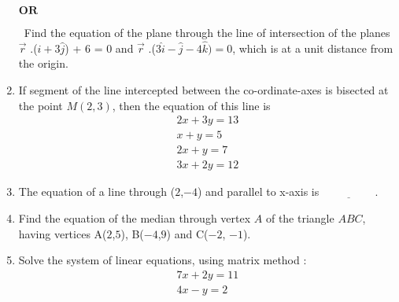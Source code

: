 \documentclass{article}
\begin{document}
\begin{enumerate}
\begin{center}
    $\textbf{OR}$
\end{center}
\ Find the equation of the plane through the line of intersection of the planes \\
    $ \overrightarrow{r}$ .($\hat{i}+3\hat{j}$) + 6 = 0  and  $ \overrightarrow{r}$ .($3\hat{i} - \hat{j} - 4\hat{k}) = 0$, which is at a unit distance from the origin.\\
    \item If segment of the line intercepted between the co-ordinate-axes is bisected
at the point $M(2, 3)$, then the equation of this line is
 \begin{align}
       2x + 3y = 13\\
       x + y = 5 \\
       2x + y = 7\\
       3x + 2y = 12
\end{align}
\item The equation of a line through ($2$,$-4$) and parallel to x-axis is $\underline{\hspace{2cm}}$.
\item Find the equation of the median through vertex $A$ of the triangle $ABC$, having vertices A($2$,$5$), B($-4$,$9$) and C($-2$, $-1$).\\
\item Solve the system of linear equations, using matrix method : 
\begin{align}
  7x + 2y = 11\\
 4x - y = 2
\end{align}
\end{enumerate}
\end{document}
